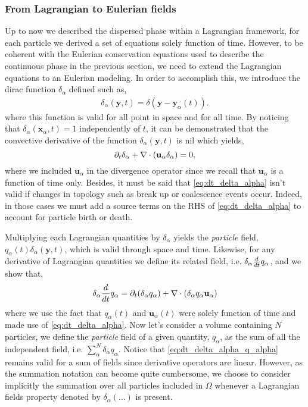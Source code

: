 \subsubsection*{From Lagrangian to Eulerian fields}

Up to now we described the dispersed phase within a Lagrangian framework, for each particle we derived a set of equations solely function of time.
However, to be coherent with the Eulerian conservation equations used to describe the continuous phase in the previous section, we need to extend the Lagrangian equations to an Eulerian modeling. 
In order to accomplish this, we introduce the dirac function $\delta_\alpha$ defined such as, 
\begin{align}
    \delta_\alpha(\textbf{y},t) = \delta(\textbf{y}-\textbf{y}_\alpha(t)).
    \label{eq:delta_alpha}
\end{align}
where this function is valid for all point in space and for all time\citep[Chapter 2]{morel2015mathematical}. 
By noticing that $\delta_\alpha(\textbf{x}_\alpha,t) = 1$ independently of $t$, it can be demonstrated that the convective derivative of the function $\delta_\alpha(\textbf{y},t)$ is nil  which yields, 
\begin{equation}
    \partial_t \delta_\alpha
    + \mathbf{\nabla} \cdot (\textbf{u}_\alpha  \delta_\alpha)
    =0,
    \label{eq:dt_delta_alpha}
\end{equation}
where we included $\textbf{u}_\alpha$ in the divergence operator since we recall that $\textbf{u}_\alpha$ is a function of time only.
Besides, it must be said that \ref{eq:dt_delta_alpha} isn't valid if changes in topology such as break up or coalescence events occur.
Indeed, in those cases we must add a source terms on the RHS of \ref{eq:dt_delta_alpha} to account for particle birth or death. 

Multiplying each Lagrangian quantities by $\delta_\alpha$ yields the \textit{particle} field, $q_\alpha(t)\delta_\alpha(\textbf{y},t)$, which is valid through space and time.
Likewise, for any derivative of Lagrangian quantities we define its related field, i.e. $\delta_\alpha \frac{d}{d t} q_\alpha$, and we show that,
\begin{equation}
    \delta_\alpha \frac{d}{d t} q_\alpha
    = \partial_t (\delta_\alpha q_\alpha)
    + \mathbf{\nabla} \cdot (\delta_\alpha q_\alpha \textbf{u}_\alpha)
    \label{eq:dt_delta_alpha_q_alpha}
\end{equation}
where we use the fact that $q_\alpha(t)$ and $\textbf{u}_\alpha(t)$ were solely function of time and made use of \ref{eq:dt_delta_alpha}.
Now let's consider a volume containing $N$ particles, we define the \textit{particle} field of a given quantity, $q_\alpha$, as the sum of all the independent field, i.e. $\sum_\alpha^N \delta_\alpha q_\alpha$.
Notice that \ref{eq:dt_delta_alpha_q_alpha} remains valid for a sum of fields since derivative operators are linear.
However, as the summation notation can become quite cumbersome, we choose to consider implicitly the summation over all particles included in $\Omega$ whenever a Lagrangian fields property denoted by $\delta_\alpha (\ldots)$ is present.

